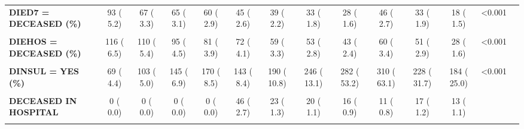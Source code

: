 \documentclass[
]{article}
\begin{document}
\begin{table}[H]
\begin{tabular}[t]{>{\raggedright\arraybackslash}p{5em}ccccccccccccc}
\textbf{DIED7 = DECEASED (\%)} & 93 (  5.2) & 67 (  3.3) & 65 (  3.1) & 60 (  2.9) & 45 (  2.6) & 39 (  2.2) & 33 (  1.8) & 28 (  1.6) & 46 (  2.7) & 33 (  1.9) & 18 (  1.5) & <0.001 & \\
\textbf{\cellcolor{gray!10}{DIED730 = DECEASED (\%)}} & \cellcolor{gray!10}{293 ( 16.6)} & \cellcolor{gray!10}{289 ( 14.2)} & \cellcolor{gray!10}{297 ( 14.3)} & \cellcolor{gray!10}{272 ( 13.2)} & \cellcolor{gray!10}{196 ( 11.5)} & \cellcolor{gray!10}{183 ( 12.4)} & \cellcolor{gray!10}{211 ( 11.7)} & \cellcolor{gray!10}{0 (  NaN)} & \cellcolor{gray!10}{0 (  NaN)} & \cellcolor{gray!10}{0 (  NaN)} & \cellcolor{gray!10}{0 (  NaN)} & \cellcolor{gray!10}{NaN} & \cellcolor{gray!10}{}\\
\textbf{DIEHOS = DECEASED (\%)} & 116 (  6.5) & 110 (  5.4) & 95 (  4.5) & 81 (  3.9) & 72 (  4.1) & 59 (  3.3) & 53 (  2.8) & 43 (  2.4) & 60 (  3.4) & 51 (  2.9) & 28 (  1.6) & <0.001 & \\
\textbf{\cellcolor{gray!10}{DIG\_CHR = YES (\%)}} & \cellcolor{gray!10}{0 (  NaN)} & \cellcolor{gray!10}{25 (  1.2)} & \cellcolor{gray!10}{20 (  1.0)} & \cellcolor{gray!10}{0 (  NaN)} & \cellcolor{gray!10}{16 (  0.9)} & \cellcolor{gray!10}{12 (  0.7)} & \cellcolor{gray!10}{13 (  0.7)} & \cellcolor{gray!10}{5 (  0.3)} & \cellcolor{gray!10}{4 (  0.6)} & \cellcolor{gray!10}{4 (  0.2)} & \cellcolor{gray!10}{330 ( 18.8)} & \cellcolor{gray!10}{NaN} & \cellcolor{gray!10}{}\\
\textbf{DINSUL = YES (\%)} & 69 (  4.4) & 103 (  5.0) & 145 (  6.9) & 170 (  8.5) & 143 (  8.4) & 190 ( 10.8) & 246 ( 13.1) & 282 ( 53.2) & 310 ( 63.1) & 228 ( 31.7) & 184 ( 25.0) & <0.001 & \\
\textbf{\cellcolor{gray!10}{DISCH (\%)}} & \cellcolor{gray!10}{} & \cellcolor{gray!10}{} & \cellcolor{gray!10}{} & \cellcolor{gray!10}{} & \cellcolor{gray!10}{} & \cellcolor{gray!10}{} & \cellcolor{gray!10}{} & \cellcolor{gray!10}{} & \cellcolor{gray!10}{} & \cellcolor{gray!10}{} & \cellcolor{gray!10}{} & \cellcolor{gray!10}{<0.001} & \cellcolor{gray!10}{}\\
\textbf{DECEASED IN HOSPITAL} & 0 (  0.0) & 0 (  0.0) & 0 (  0.0) & 0 (  0.0) & 46 (  2.7) & 23 (  1.3) & 20 (  1.1) & 16 (  0.9) & 11 (  0.8) & 17 (  1.2) & 13 (  1.1) &  & \\
\textbf{\cellcolor{gray!10}{DISCHARGED FROM HOSPITAL}} & \cellcolor{gray!10}{1524 ( 96.3)} & \cellcolor{gray!10}{1886 ( 95.4)} & \cellcolor{gray!10}{1909 ( 97.2)} & \cellcolor{gray!10}{1890 ( 95.1)} & \cellcolor{gray!10}{1634 ( 94.9)} & \cellcolor{gray!10}{1626 ( 93.3)} & \cellcolor{gray!10}{1354 ( 73.3)} & \cellcolor{gray!10}{1616 ( 91.8)} & \cellcolor{gray!10}{1387 ( 95.4)} & \cellcolor{gray!10}{1447 ( 98.5)} & \cellcolor{gray!10}{1129 ( 98.2)} & \cellcolor{gray!10}{} & \cellcolor{gray!10}{}\\

\end{tabular}
\end{table}
\end{document}

